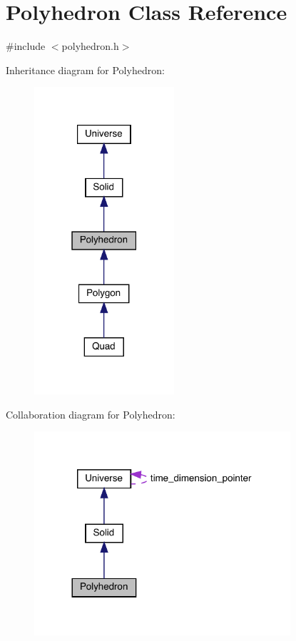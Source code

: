 \hypertarget{class_polyhedron}{}\section{Polyhedron Class Reference}
\label{class_polyhedron}


{\ttfamily \#include $<$polyhedron.\+h$>$}



Inheritance diagram for Polyhedron\+:\nopagebreak
\begin{figure}[H]
\begin{center}
\leavevmode
\includegraphics[width=147pt]{class_polyhedron__inherit__graph}
\end{center}
\end{figure}


Collaboration diagram for Polyhedron\+:\nopagebreak
\begin{figure}[H]
\begin{center}
\leavevmode
\includegraphics[width=269pt]{class_polyhedron__coll__graph}
\end{center}
\end{figure}
